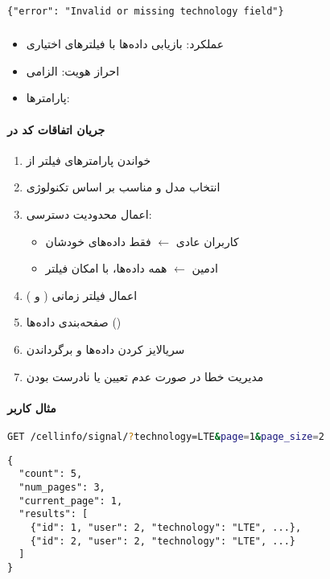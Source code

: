 \documentclass{report}
\begin{document}
\paragraph{}
\begin{latin}
\begin{lstlisting}[style=jsonstyle]
{"error": "Invalid or missing technology field"}
\end{lstlisting}
\end{latin}

\subsubsection{}
\begin{itemize}
    \item عملکرد: بازیابی داده‌ها با فیلترهای اختیاری
    \item احراز هویت: الزامی
    \item پارامترها: 
\end{itemize}

\paragraph{جریان اتفاقات کد در }
\begin{enumerate}
    \item خواندن پارامترهای فیلتر از 
    \item انتخاب مدل و  مناسب بر اساس تکنولوژی
    \item اعمال محدودیت دسترسی:
    \begin{itemize}
        \item کاربران عادی $\leftarrow$ فقط داده‌های خودشان
        \item ادمین $\leftarrow$ همه داده‌ها، با امکان فیلتر 
    \end{itemize}
    \item اعمال فیلتر زمانی ( و )
    \item صفحه‌بندی داده‌ها ()
    \item سریالایز کردن داده‌ها و برگرداندن 
    \item مدیریت خطا در صورت عدم تعیین یا نادرست بودن 
\end{enumerate}

\paragraph{مثال  کاربر}
\begin{latin}
\begin{lstlisting}[style=jsonstyle, language=bash]
GET /cellinfo/signal/?technology=LTE&page=1&page_size=2
\end{lstlisting}
\begin{lstlisting}[style=jsonstyle]
{
  "count": 5,
  "num_pages": 3,
  "current_page": 1,
  "results": [
    {"id": 1, "user": 2, "technology": "LTE", ...},
    {"id": 2, "user": 2, "technology": "LTE", ...}
  ]
}
\end{lstlisting}
\end{latin}
\end{document}
